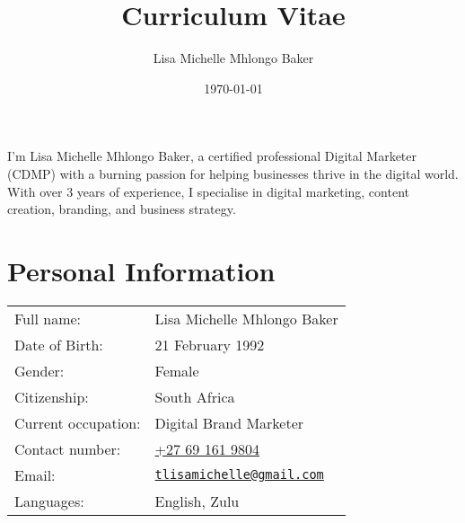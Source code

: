 \documentclass{article}
\author{Lisa Michelle Mhlongo Baker}
\title{Curriculum Vitae}
\date{\today}
\newcommand{\email}[1]{\href{mailto:#1}{\texttt{#1}}}
\begin{document}
 \maketitle


\begin{center}
  \begin{minipage}{0.78\textwidth}
    I'm Lisa Michelle Mhlongo Baker, a certified professional Digital Marketer (CDMP) with a burning passion for helping businesses thrive in the digital world.
    With over 3 years of experience, I specialise in digital marketing, content creation, branding, and business strategy.
  \end{minipage}
\end{center}


\section*{Personal Information}
\begin{center} \begin{tabular}{ll}
	Full name: 								& Lisa Michelle Mhlongo Baker \\
	Date of Birth:						& 21 February 1992 \\
	Gender: 									& Female \\
	Citizenship:							& South Africa \\
	Current occupation:				& Digital Brand Marketer \\
	Contact number:	  				& \href{tel:+27691619804}{+27 69 161 9804} \\
	Email:										& \email{tlisamichelle@gmail.com} \\
	Languages:								& English, Zulu \\
\end{tabular} \end{center}
\end{document}
